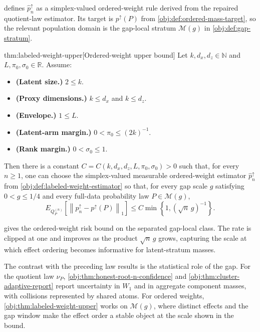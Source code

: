 \documentclass[11pt]{article}
\begin{document}
 defines \(\widehat p_n^{\uparrow}\) as a simplex-valued ordered-weight rule derived from the repaired quotient-law estimator. Its target is \(p^{\uparrow}(P)\) from \cref{obj:def:ordered-mass-target}, so the relevant population domain is the gap-local stratum \(\mathcal M(g)\) in \cref{obj:def:gap-stratum}.

\begin{theoremv}{thm:labeled-weight-upper}[Ordered-weight upper bound]
Let \(k,d_x,d_z\in\mathbb N\) and \(L,\pi_0,\sigma_0\in\mathbb R\).  Assume:
\begin{itemize}
\item \textbf{(Latent size.)} \(2\le k\).
\item \textbf{(Proxy dimensions.)} \(k\le d_x\) and \(k\le d_z\).
\item \textbf{(Envelope.)} \(1\le L\).
\item \textbf{(Latent-arm margin.)} \(0<\pi_0\le (2k)^{-1}\).
\item \textbf{(Rank margin.)} \(0<\sigma_0\le 1\).
\end{itemize}
Then there is a constant \(C=C(k,d_x,d_z,L,\pi_0,\sigma_0)>0\) such that, for every \(n\ge1\), one can choose the simplex-valued measurable ordered-weight estimator \(\widehat p_n^{\uparrow}\) from \cref{obj:def:labeled-weight-estimator} so that, for every gap scale \(g\) satisfying \(0<g\le1/4\) and every full-data probability law \(P\in\mathcal M(g)\),
\[
E_{Q_P^{(n)}}\!\left[\left\|\widehat p_n^{\uparrow}-p^{\uparrow}(P)\right\|_1\right]
\le
C\min\left\{1,\left(\sqrt n\,g\right)^{-1}\right\}.
\]
\end{theoremv}

 gives the ordered-weight risk bound on the separated gap-local class. The rate is clipped at one and improves as the product \(\sqrt n\,g\) grows, capturing the scale at which effect ordering becomes informative for latent-stratum masses.

The contrast with the preceding law results is the statistical role of the gap. For the quotient law \(\nu_P\), \cref{obj:thm:honest-root-n-confidence} and \cref{obj:thm:cluster-adaptive-report} report uncertainty in \(W_1\) and in aggregate component masses, with collisions represented by shared atoms. For ordered weights, \cref{obj:thm:labeled-weight-upper} works on \(\mathcal M(g)\), where distinct effects and the gap window make the effect order a stable object at the scale shown in the bound.
\end{document}
